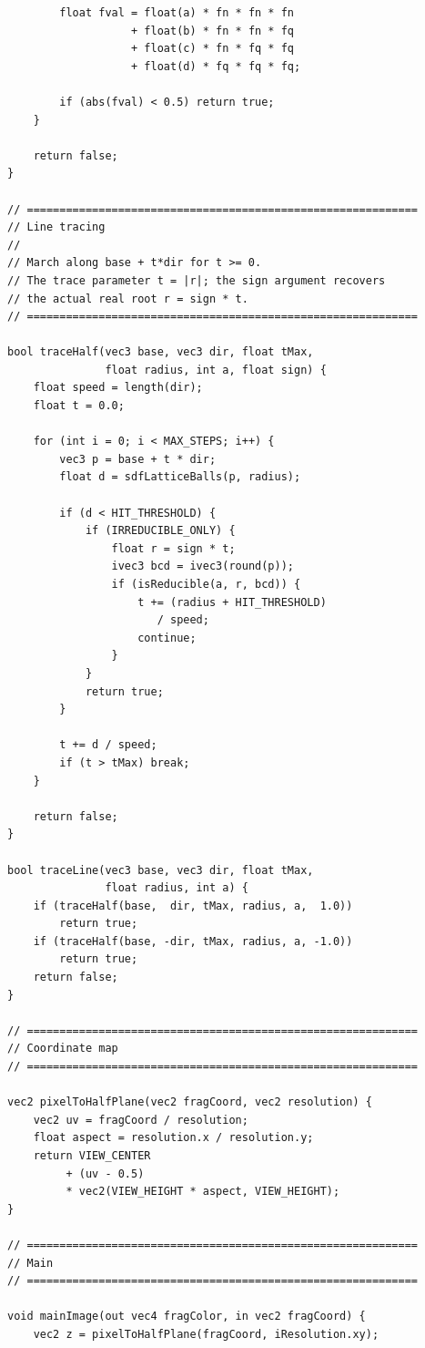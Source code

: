 \documentclass[11pt]{article}
\begin{document}
\begin{lstlisting}
        float fval = float(a) * fn * fn * fn
                   + float(b) * fn * fn * fq
                   + float(c) * fn * fq * fq
                   + float(d) * fq * fq * fq;

        if (abs(fval) < 0.5) return true;
    }

    return false;
}

// ============================================================
// Line tracing
//
// March along base + t*dir for t >= 0.
// The trace parameter t = |r|; the sign argument recovers
// the actual real root r = sign * t.
// ============================================================

bool traceHalf(vec3 base, vec3 dir, float tMax,
               float radius, int a, float sign) {
    float speed = length(dir);
    float t = 0.0;

    for (int i = 0; i < MAX_STEPS; i++) {
        vec3 p = base + t * dir;
        float d = sdfLatticeBalls(p, radius);

        if (d < HIT_THRESHOLD) {
            if (IRREDUCIBLE_ONLY) {
                float r = sign * t;
                ivec3 bcd = ivec3(round(p));
                if (isReducible(a, r, bcd)) {
                    t += (radius + HIT_THRESHOLD)
                       / speed;
                    continue;
                }
            }
            return true;
        }

        t += d / speed;
        if (t > tMax) break;
    }

    return false;
}

bool traceLine(vec3 base, vec3 dir, float tMax,
               float radius, int a) {
    if (traceHalf(base,  dir, tMax, radius, a,  1.0))
        return true;
    if (traceHalf(base, -dir, tMax, radius, a, -1.0))
        return true;
    return false;
}

// ============================================================
// Coordinate map
// ============================================================

vec2 pixelToHalfPlane(vec2 fragCoord, vec2 resolution) {
    vec2 uv = fragCoord / resolution;
    float aspect = resolution.x / resolution.y;
    return VIEW_CENTER
         + (uv - 0.5)
         * vec2(VIEW_HEIGHT * aspect, VIEW_HEIGHT);
}

// ============================================================
// Main
// ============================================================

void mainImage(out vec4 fragColor, in vec2 fragCoord) {
    vec2 z = pixelToHalfPlane(fragCoord, iResolution.xy);


\end{lstlisting}
\end{document}
